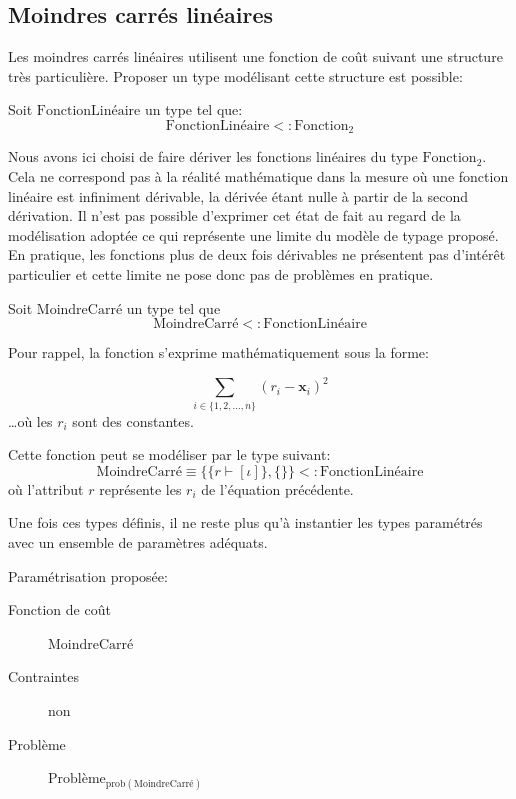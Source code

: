 \subsection{Moindres carrés linéaires}

Les moindres carrés linéaires utilisent une fonction de coût suivant
une structure très particulière. Proposer un type modélisant cette structure est possible:

\begin{mydef}\label{ex:chap1_linearfct}
  Soit $\text{FonctionLinéaire}$ un type tel que:
  $$\text{FonctionLinéaire} <: \text{Fonction}_2$$
\end{mydef}

Nous avons ici choisi de faire dériver les fonctions linéaires du type
$\text{Fonction}_2$. Cela ne correspond pas à la réalité mathématique
dans la mesure où une fonction linéaire est infiniment dérivable, la
dérivée étant nulle à partir de la second dérivation. Il n'est pas
possible d'exprimer cet état de fait au regard de la modélisation
adoptée ce qui représente une limite du modèle de typage proposé. En
pratique, les fonctions plus de deux fois dérivables ne présentent pas
d'intérêt particulier et cette limite ne pose donc pas de problèmes en
pratique.

\begin{mydef}\label{ex:chap1_leastsquarefct}
  Soit $\text{MoindreCarré}$ un type tel que
  $$\text{MoindreCarré} <: \text{FonctionLinéaire}$$

  Pour rappel, la fonction s'exprime mathématiquement sous la forme:

  \begin{equation}
    \sum_{i \in \{1, 2, \dotsc, n\}} (r_i - \mathbf{x}_i)^2
  \end{equation}
  \ldots où les $r_i$ sont des constantes.

  Cette fonction peut se modéliser par le type suivant:
  \begin{equation}
    \text{MoindreCarré} \equiv \{ \{ r \vdash [\iota] \}, \{ \} \} <: \text{FonctionLinéaire}
  \end{equation}
  où l'attribut $r$ représente les $r_i$ de l'équation précédente.
\end{mydef}


Une fois ces types définis, il ne reste plus qu'à instantier les types
paramétrés avec un ensemble de paramètres adéquats.

\begin{myexample}\label{ex:chap1_leastsquare}
  Paramétrisation proposée:
  \begin{description}
  \item[Fonction de coût] $\text{MoindreCarré}$
  \item[Contraintes] non
  \item[Problème] $\text{Problème}_{\text{prob}(\text{MoindreCarré})}$
  \end{description}
\end{myexample}



